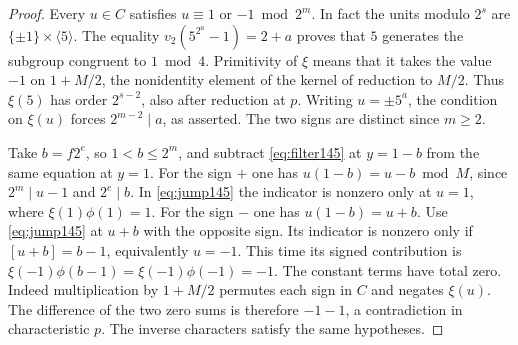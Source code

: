 \documentclass[a4paper,11pt]{article}
\theoremstyle{definition}
\theoremstyle{remark}
\numberwithin{equation}{section}
\begin{document}
\begin{proof}
Every \(u\in C\) satisfies \(u\equiv 1\) or \(-1\bmod 2^m\).
In fact the units modulo \(2^s\) are \(\{\pm1\}\times\langle5\rangle\).
The equality \(v_2(5^{2^a}-1)=2+a\) proves that \(5\) generates
the subgroup congruent to \(1\bmod4\). Primitivity of \(\xi\)
means that it takes the value \(-1\) on \(1+M/2\), the nonidentity
element of the kernel of reduction to \(M/2\). Thus \(\xi(5)\)
has order \(2^{s-2}\), also after reduction at \(p\). Writing
\(u=\pm5^a\), the condition on \(\xi(u)\) forces \(2^{m-2}\mid a\),
as asserted. The two signs are distinct since \(m\ge2\).

Take \(b=f2^e\), so \(1<b\le2^m\), and subtract
\eqref{eq:filter145} at \(y=1-b\) from the same equation at
\(y=1\). For the sign \(+\) one has \(u(1-b)=u-b\bmod M\),
since \(2^m\mid u-1\) and \(2^e\mid b\). In \eqref{eq:jump145}
the indicator is nonzero only at \(u=1\), where \(\xi(1)\phi(1)=1\).
For the sign \(-\) one has \(u(1-b)=u+b\). Use
\eqref{eq:jump145} at \(u+b\) with the opposite sign. Its
indicator is nonzero only if \([u+b]=b-1\), equivalently
\(u=-1\). This time its signed contribution is
\(\xi(-1)\phi(b-1)=\xi(-1)\phi(-1)=-1\).
The constant terms have total zero. Indeed multiplication by
\(1+M/2\) permutes each sign in \(C\) and negates \(\xi(u)\).
The difference of the two zero sums is therefore \(-1-1\),
a contradiction in characteristic \(p\). The inverse characters
satisfy the same hypotheses.
\end{proof}
\end{document}
